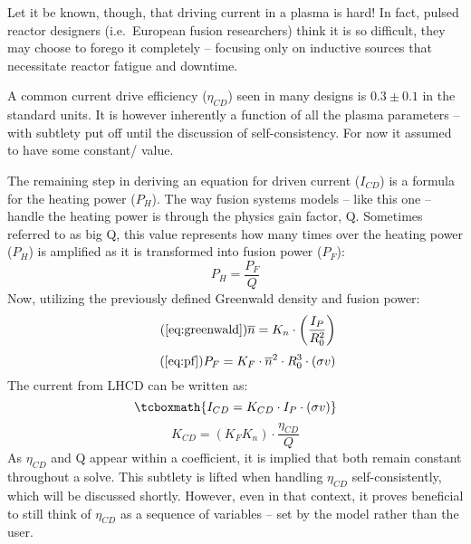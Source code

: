 Let it be known, though, that driving current in a plasma is hard! In fact, pulsed reactor designers (i.e.\ European fusion researchers) think it is so difficult, they may choose to forego it completely -- focusing only on inductive sources that necessitate reactor fatigue and downtime.

A common current drive efficiency ($\eta_{CD}$) seen in many designs is $0.3 \pm 0.1 $ in the standard units. It is however inherently a function of all the plasma parameters -- with subtlety put off until the discussion of self-consistency. For now it assumed to have some constant/ value.

The remaining step in deriving an equation for driven current ($I_{CD}$) is a formula for the heating power ($P_H$). The way fusion systems models -- like this one -- handle the heating power is through the physics gain factor, Q. Sometimes referred to as big Q, this value represents how many times over the heating power ($P_H$) is amplified as it is transformed into fusion power ($P_F$):
\begin{equation}
	\label{eq:ph}
	P_H = \frac{P_F}{Q}
\end{equation}
Now, utilizing the previously defined Greenwald density and fusion power:
 \begin{equation}
 	\tag{\ref{eq:greenwald}}
 	\overline n = K_n \cdot \left( \frac{I_P}{R_0^2} \right)
 \end{equation}
 \begin{equation}
	\tag{\ref{eq:pf}}
	P_F = K_F \cdot \overline{n}^2 \cdot R_0^3  \cdot (\sigma v)
\end{equation}
The current from LHCD can be written as:
\begin{equation}
	\label{eq:icd}
	\tcboxmath{
	I_{CD} = K_{CD} \cdot I_P \cdot ( \sigma v )
	}
\end{equation}
\begin{equation}
	K_{CD} = \left( K_F K_n \right) \cdot \frac{\eta_{CD}}{Q}
\end{equation}
As $\eta_{CD}$ and Q appear within a  coefficient, it is implied that both remain constant throughout a solve. This subtlety is lifted when handling $\eta_{CD}$ self-consistently, which will be discussed shortly. However, even in that context, it proves beneficial to still think of $\eta_{CD}$ as a sequence of  variables -- set by the model rather than the user.

